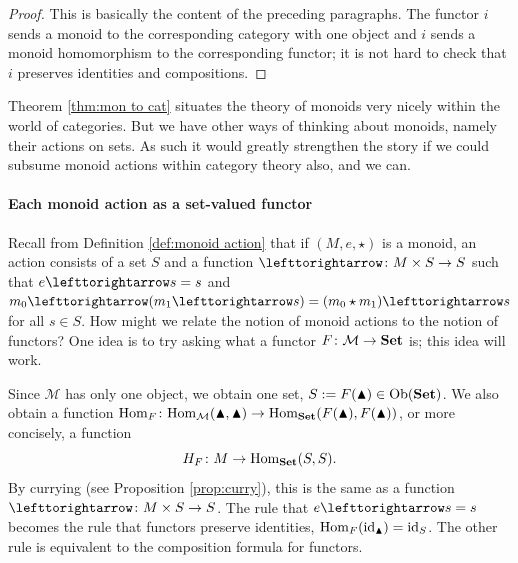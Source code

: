 \documentclass{book}
\def\tn{\textnormal}
\def\mc{\mathcal}
\def\Hom{\tn{Hom}}
\def\Ob{\tn{Ob}}
\def\to{\rightarrow}
\def\taking{\colon}
\def\acts{\lefttorightarrow}
\def\monOb{\blacktriangle}
\def\id{\tn{id}}
\def\Set{{\bf Set}}
\def\mcM{\mc{M}}
\theoremstyle{remark}
\theoremstyle{definition}
\begin{document}
\begin{proof}

This is basically the content of the preceding paragraphs. The functor $i$ sends a monoid to the corresponding category with one object and $i$ sends a monoid homomorphism to the corresponding functor; it is not hard to check that $i$ preserves identities and compositions.

\end{proof}

Theorem \ref{thm:mon to cat} situates the theory of monoids very nicely within the world of categories. But we have other ways of thinking about monoids, namely their actions on sets. As such it would greatly strengthen the story if we could subsume monoid actions within category theory also, and we can.

\paragraph{Each monoid action as a set-valued functor}

Recall from Definition \ref{def:monoid action} that if $(M,e,\star)$ is a monoid, an action consists of a set $S$ and a function $\acts\taking M\times S\to S$ such that $e\acts s=s$ and $m_0\acts (m_1\acts s)=(m_0\star m_1)\acts s$ for all $s\in S$. How might we relate the notion of monoid actions to the notion of functors? One idea is to try asking what a functor $F\taking\mcM\to\Set$ is; this idea will work.

Since $\mcM$ has only one object, we obtain one set, $S:=F(\monOb)\in\Ob(\Set)$. We also obtain a function $\Hom_F\taking\Hom_\mcM(\monOb,\monOb)\to\Hom_\Set(F(\monOb),F(\monOb))$, or more concisely, a function $$H_F\taking M\to\Hom_\Set(S,S).$$ By currying (see Proposition \ref{prop:curry}), this is the same as a function $\acts\taking M\times S\to S$. The rule that $e\acts s=s$ becomes the rule that functors preserve identities, $\Hom_F(\id_\monOb)=\id_S$. The other rule is equivalent to the composition formula for functors. 
\end{document}
